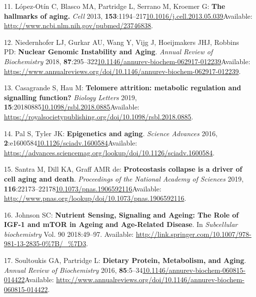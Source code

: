 \documentclass[
]{book}
\begin{document}
\leavevmode\hypertarget{ref-Lopez-Otin2013}{}%
11. López-Otín C, Blasco MA, Partridge L, Serrano M, Kroemer G: \textbf{The hallmarks of aging.} \emph{Cell} 2013, \textbf{153}:1194--217\href{https://doi.org/10.1016/j.cell.2013.05.039}{10.1016/j.cell.2013.05.039}Available: \url{http://www.ncbi.nlm.nih.gov/pubmed/23746838}.

\leavevmode\hypertarget{ref-Niedernhofer2018}{}%
12. Niedernhofer LJ, Gurkar AU, Wang Y, Vijg J, Hoeijmakers JHJ, Robbins PD: \textbf{Nuclear Genomic Instability and Aging}. \emph{Annual Review of Biochemistry} 2018, \textbf{87}:295--322\href{https://doi.org/10.1146/annurev-biochem-062917-012239}{10.1146/annurev-biochem-062917-012239}Available: \url{https://www.annualreviews.org/doi/10.1146/annurev-biochem-062917-012239}.

\leavevmode\hypertarget{ref-Casagrande2019}{}%
13. Casagrande S, Hau M: \textbf{Telomere attrition: metabolic regulation and signalling function?} \emph{Biology Letters} 2019, \textbf{15}:20180885\href{https://doi.org/10.1098/rsbl.2018.0885}{10.1098/rsbl.2018.0885}Available: \url{https://royalsocietypublishing.org/doi/10.1098/rsbl.2018.0885}.

\leavevmode\hypertarget{ref-Saldanha2015}{}%
14. Pal S, Tyler JK: \textbf{Epigenetics and aging}. \emph{Science Advances} 2016, \textbf{2}:e1600584\href{https://doi.org/10.1126/sciadv.1600584}{10.1126/sciadv.1600584}Available: \url{https://advances.sciencemag.org/lookup/doi/10.1126/sciadv.1600584}.

\leavevmode\hypertarget{ref-Santra2019}{}%
15. Santra M, Dill KA, Graff AMR de: \textbf{Proteostasis collapse is a driver of cell aging and death}. \emph{Proceedings of the National Academy of Sciences} 2019, \textbf{116}:22173--22178\href{https://doi.org/10.1073/pnas.1906592116}{10.1073/pnas.1906592116}Available: \url{http://www.pnas.org/lookup/doi/10.1073/pnas.1906592116}.

\leavevmode\hypertarget{ref-Johnson2018}{}%
16. Johnson SC: \textbf{Nutrient Sensing, Signaling and Ageing: The Role of IGF-1 and mTOR in Ageing and Age-Related Disease}. In \emph{Subcellular biochemistry} Vol. 90 2018:49--97. Available: \url{http://link.springer.com/10.1007/978-981-13-2835-0\%7B/_\%7D3}.

\leavevmode\hypertarget{ref-Soultoukis2016}{}%
17. Soultoukis GA, Partridge L: \textbf{Dietary Protein, Metabolism, and Aging}. \emph{Annual Review of Biochemistry} 2016, \textbf{85}:5--34\href{https://doi.org/10.1146/annurev-biochem-060815-014422}{10.1146/annurev-biochem-060815-014422}Available: \url{http://www.annualreviews.org/doi/10.1146/annurev-biochem-060815-014422}.
\end{document}
